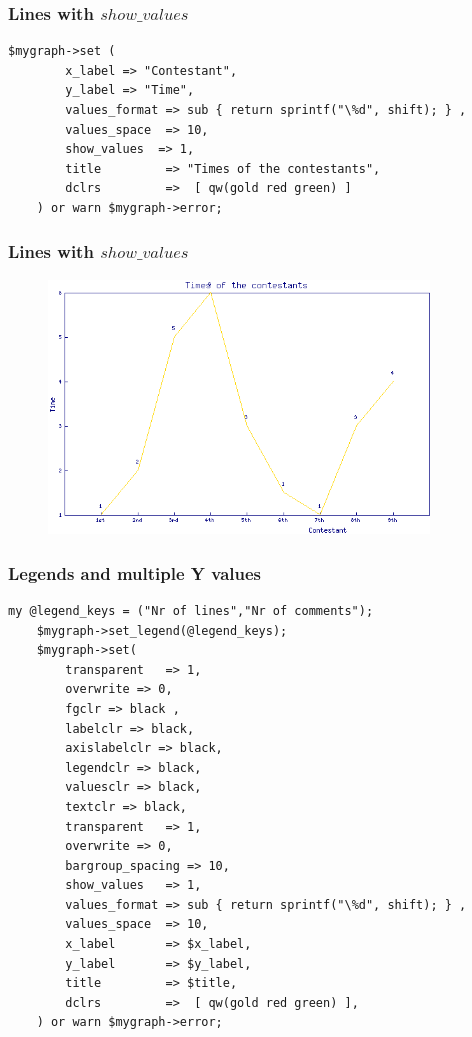 \documentclass{beamer}
\begin{document}
\begin{frame}[fragile] \frametitle{Lines with $show\_values$}
\begin{lstlisting}[language=perl_u,breaklines=true]
    $mygraph->set (
        x_label => "Contestant",
        y_label => "Time",
        values_format => sub { return sprintf("\%d", shift); } , 
        values_space  => 10, 
        show_values  => 1,
        title         => "Times of the contestants",
        dclrs         =>  [ qw(gold red green) ]
    ) or warn $mygraph->error;
\end{lstlisting}
\end{frame}

\begin{frame}[fragile] \frametitle{Lines with $show\_values$}
\begin{figure}[htbp]
\begin{center}
\includegraphics[width=0.9\textwidth]{image/linesNumbers.png}
\end{center}
\end{figure}
\end{frame}

\begin{frame}[fragile] \frametitle{Legends and multiple Y values}
\begin{lstlisting}[language=perl_u,breaklines=true]
    my @legend_keys = ("Nr of lines","Nr of comments");
    $mygraph->set_legend(@legend_keys);
    $mygraph->set(
        transparent   => 1,
        overwrite => 0,
        fgclr => black ,
        labelclr => black,
        axislabelclr => black,
        legendclr => black,
        valuesclr => black,
        textclr => black,
        transparent   => 1,
        overwrite => 0,
        bargroup_spacing => 10,
        show_values   => 1,
        values_format => sub { return sprintf("\%d", shift); } ,
        values_space  => 10,
        x_label       => $x_label,
        y_label       => $y_label,
        title         => $title,
        dclrs         =>  [ qw(gold red green) ],
    ) or warn $mygraph->error;
\end{lstlisting}
\end{frame}
\end{document}
